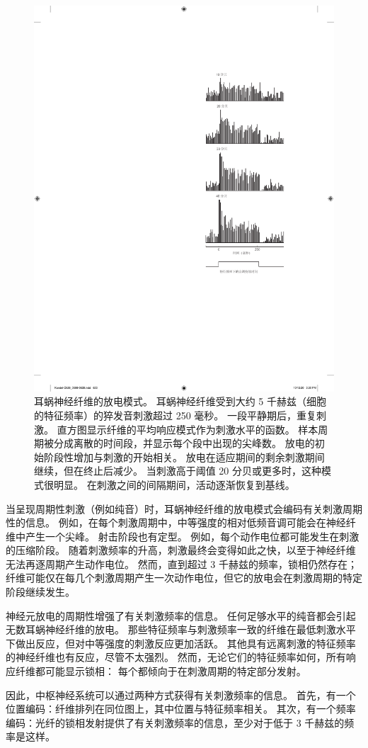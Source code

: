 \begin{figure}[htbp]
	\centering
	\includegraphics[width=0.55\linewidth]{chap26/fig_26_18}
	\caption{耳蜗神经纤维的放电模式。
		耳蜗神经纤维受到大约 5 千赫兹（细胞的特征频率）的猝发音刺激超过 250 毫秒。
		一段平静期后，重复刺激。
		直方图显示纤维的平均响应模式作为刺激水平的函数。
		样本周期被分成离散的时间段，并显示每个段中出现的尖峰数。
		放电的初始阶段性增加与刺激的开始相关。
		放电在适应期间的剩余刺激期间继续，但在终止后减少。
		当刺激高于阈值 20 分贝或更多时，这种模式很明显。
		在刺激之间的间隔期间，活动逐渐恢复到基线\cite{kiang1965discharge}。}
	\label{fig:26_18}
\end{figure}


当呈现周期性刺激（例如纯音）时，耳蜗神经纤维的放电模式会编码有关刺激周期性的信息。
例如，在每个刺激周期中，中等强度的相对低频音调可能会在神经纤维中产生一个尖峰。
射击阶段也有定型。
例如，每个动作电位都可能发生在刺激的压缩阶段。
随着刺激频率的升高，刺激最终会变得如此之快，以至于神经纤维无法再逐周期产生动作电位。
然而，直到超过 3 千赫兹的频率，锁相仍然存在；
纤维可能仅在每几个刺激周期产生一次动作电位，但它的放电会在刺激周期的特定阶段继续发生。


神经元放电的周期性增强了有关刺激频率的信息。
任何足够水平的纯音都会引起无数耳蜗神经纤维的放电。
那些特征频率与刺激频率一致的纤维在最低刺激水平下做出反应，但对中等强度的刺激反应更加活跃。
其他具有远离刺激的特征频率的神经纤维也有反应，尽管不太强烈。
然而，无论它们的特征频率如何，所有响应纤维都可能显示锁相：
每个都倾向于在刺激周期的特定部分发射。


因此，中枢神经系统可以通过两种方式获得有关刺激频率的信息。
首先，有一个位置编码：纤维排列在同位图上，其中位置与特征频率相关。
其次，有一个频率编码：光纤的锁相发射提供了有关刺激频率的信息，至少对于低于 3 千赫兹的频率是这样。



